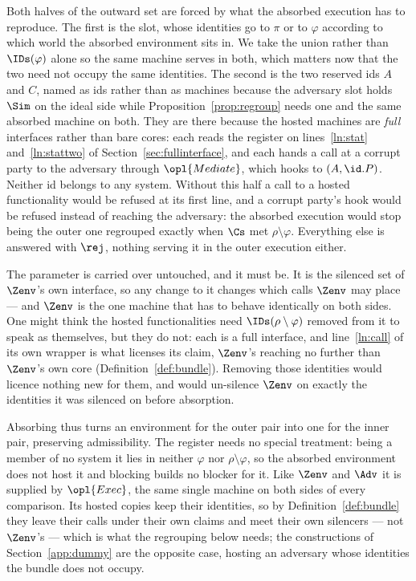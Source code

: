 \documentclass[10pt,oneside,openany]{book}
\theoremstyle{accentdef}
\theoremstyle{accentplain}
\begin{document}
Both halves of the outward set are forced by what the absorbed execution has to reproduce. The
first is the slot, whose identities go to $\pi$ or to $\varphi$ according to which world the
absorbed environment sits in. We take the union rather than $\IDs(\varphi)$ alone so the same
machine serves in both, which matters now that the two need not occupy the same identities.
The second is the two reserved ids $A$ and $C$, named as ids rather than as machines because the
adversary slot holds $\Sim$ on the ideal side while Proposition~\ref{prop:regroup} needs one and the same
absorbed machine on both. They are there because the hosted machines are \emph{full} interfaces
rather than bare cores: each reads the register on lines~\ref{ln:stat} and~\ref{ln:stattwo} of
Section~\ref{sec:fullinterface}, and each hands a call at a corrupt party to the adversary through
$\opl{Mediate}$, which hooks to $(A,\id.P)$. Neither id belongs to any system. Without this half a
call to a hosted functionality would be refused at its first line, and a corrupt party's hook
would be refused instead of reaching the adversary: the absorbed execution would stop being the
outer one regrouped exactly when $\Cs$ met $\rho \setminus \varphi$. Everything else is answered
with $\rej$, nothing serving it in the outer execution either.

The parameter is carried over untouched, and it must be. It is the silenced set of $\Zenv$'s own
interface, so any change to it changes which calls $\Zenv$ may place --- and $\Zenv$ is the one
machine that has to behave identically on both sides. One might think the hosted functionalities
need $\IDs(\rho \setminus \varphi)$ removed from it to speak as themselves, but they do not: each
is a full interface, and line~\ref{ln:call} of its own wrapper is what licenses its claim,
$\Zenv$'s reaching no further than $\Zenv$'s own core (Definition~\ref{def:bundle}). Removing those
identities would licence nothing new for them, and would un-silence $\Zenv$ on exactly the
identities it was silenced on before absorption.

Absorbing thus turns an environment for the outer pair into one for the inner pair, preserving
admissibility. The register needs no special treatment: being a member of no system it lies in
neither $\varphi$ nor $\rho \setminus \varphi$, so the absorbed environment does not host it and
blocking builds no blocker for it. Like $\Zenv$ and $\Adv$ it is supplied by $\opl{Exec}$, the
same single machine on both sides of every comparison. Its hosted copies keep their identities,
so by Definition~\ref{def:bundle} they leave their calls under their own claims and meet their own
silencers --- not $\Zenv$'s --- which is what the regrouping below needs; the constructions of
Section~\ref{app:dummy} are the opposite case, hosting an adversary whose identities the bundle
does not occupy.
\end{document}
